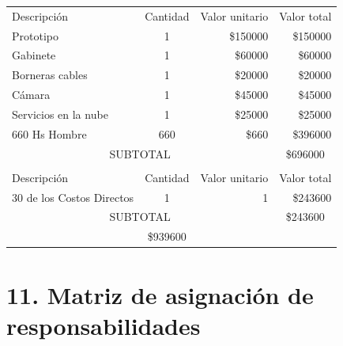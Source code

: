 \documentclass[11pt]{charter}
\begin{document}
\begin{table}[htpb]
\centering
\begin{tabularx}{\linewidth}{@{}|X|c|r|r|@{}}
\hline
\rowcolor[HTML]{C0C0C0} 
\multicolumn{4}{|c|}{\cellcolor[HTML]{C0C0C0}COSTOS DIRECTOS} \\ \hline
\rowcolor[HTML]{C0C0C0} 
Descripción &
  \multicolumn{1}{c|}{\cellcolor[HTML]{C0C0C0}Cantidad} &
  \multicolumn{1}{c|}{\cellcolor[HTML]{C0C0C0}Valor unitario} &
  \multicolumn{1}{c|}{\cellcolor[HTML]{C0C0C0}Valor total} \\ \hline

  
\multicolumn{1}{|l|}{Prototipo}				&1	&\$150000	&\$150000	\\ \hline
\multicolumn{1}{|l|}{Gabinete}				&1	&\$60000	&\$60000	\\ \hline
\multicolumn{1}{|l|}{Borneras cables}		&1	&\$20000	&\$20000	\\ \hline
\multicolumn{1}{|l|}{Cámara}				&1	&\$45000	&\$45000	\\ \hline
\multicolumn{1}{|l|}{Servicios en la nube}	&1	&\$25000	&\$25000	\\ \hline
\multicolumn{1}{|l|}{660 Hs Hombre}    		&660	&\$660	&\$396000 \\ \hline
\multicolumn{3}{|c|}{SUBTOTAL} &
\multicolumn{1}{c|}{\$696000} \\ \hline

\rowcolor[HTML]{C0C0C0} 
\multicolumn{4}{|c|}{\cellcolor[HTML]{C0C0C0}COSTOS INDIRECTOS} \\ \hline
\rowcolor[HTML]{C0C0C0} 
Descripción &  
  \multicolumn{1}{c|}{\cellcolor[HTML]{C0C0C0}Cantidad} &
  \multicolumn{1}{c|}{\cellcolor[HTML]{C0C0C0}Valor unitario} &
  \multicolumn{1}{c|}{\cellcolor[HTML]{C0C0C0}Valor total} \\ \hline
\multicolumn{1}{|l|}{30 de los Costos Directos } &1   &1   &\$243600
   \\ \hline

\multicolumn{3}{|c|}{SUBTOTAL} &
  \multicolumn{1}{c|}{\$243600} \\ \hline
\rowcolor[HTML]{C0C0C0}
\multicolumn{3}{|c|}{TOTAL} & \$939600
   \\ \hline
\end{tabularx}%
\end{table}
\newpage

\section{11. Matriz de asignación de responsabilidades}
\label{sec:responsabilidades}
\end{document}
